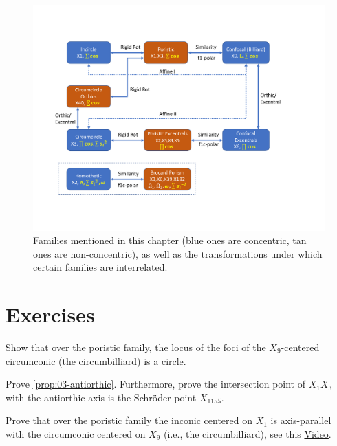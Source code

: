 \begin{figure}
    \centering
    \includegraphics[trim={60 90 80 90},clip,width=\textwidth]{chap_03/pics/pics_03_250_poncelet_transformations.pdf}
  \caption{Families mentioned in this chapter (blue ones are concentric, tan ones are non-concentric), as well as the transformations under which certain families are interrelated.}
    \label{fig:03-transformations}
\end{figure}

\section{Exercises}

\begin{exercise}
Show that over the poristic family, the locus of the foci of the $X_9$-centered circumconic (the circumbilliard) is a circle.
\end{exercise}

\begin{exercise}
Prove \cref{prop:03-antiorthic}. Furthermore, prove the intersection point of $X_1 X_3$ with the antiorthic axis is the Schröder point $X_{1155}$.
\end{exercise}

\begin{exercise}
Prove that over the poristic family the inconic centered on $X_1$ is axis-parallel with the circumconic centered on $X_9$ (i.e., the circumbilliard), see this \href{https://youtu.be/0VHBjdHXbJc}{Video}.
\end{exercise}


